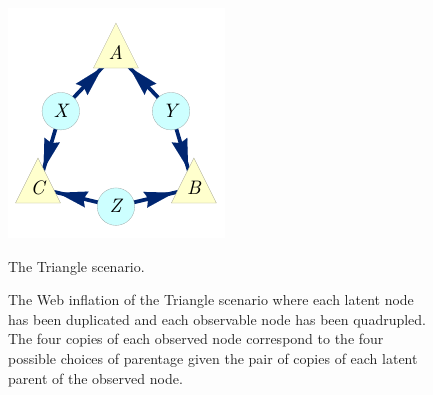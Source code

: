 \documentclass[aps,english,superscriptaddress,onecolumn,twoside,longbibliography,pra,floatfix,fleqn,nofootinbib]{revtex4-1}%
\theoremstyle{definition}
\begin{document}
\begin{figure}[h]
\centering
\begin{minipage}[t]{0.23\linewidth}
\centering
\includegraphics[scale=1]{TriDagRawALT.pdf}
\caption{The Triangle scenario.}\label{fig:TriMainDAG}
\end{minipage}
\hfill
\begin{minipage}[t]{0.43\linewidth}
\centering
{}
\caption{The Web inflation of the 
Triangle scenario where each latent node has been duplicated and each observable node has been quadrupled. The four copies of each observed node correspond to the four possible choices of parentage given the pair of copies of each latent parent of the observed node.}\label{fig:TriFullDouble}
\end{minipage}
\hfill
\begin{minipage}[t]{0.3\linewidth}

\end{minipage}
\end{figure}
\end{document}
